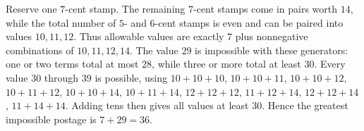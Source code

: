 Reserve one $7$-cent stamp. The remaining $7$-cent stamps come in pairs worth $14$, while the total number of $5$- and $6$-cent stamps is even and can be paired into values $10,11,12$. Thus allowable values are exactly $7$ plus nonnegative combinations of $10,11,12,14$. The value $29$ is impossible with these generators: one or two terms total at most $28$, while three or more total at least $30$. Every value $30$ through $39$ is possible, using $10+10+10$, $10+10+11$, $10+10+12$, $10+11+12$, $10+10+14$, $10+11+14$, $12+12+12$, $11+12+14$, $12+12+14$, $11+14+14$. Adding tens then gives all values at least $30$. Hence the greatest impossible postage is $7+29=\boxed{36}$.
